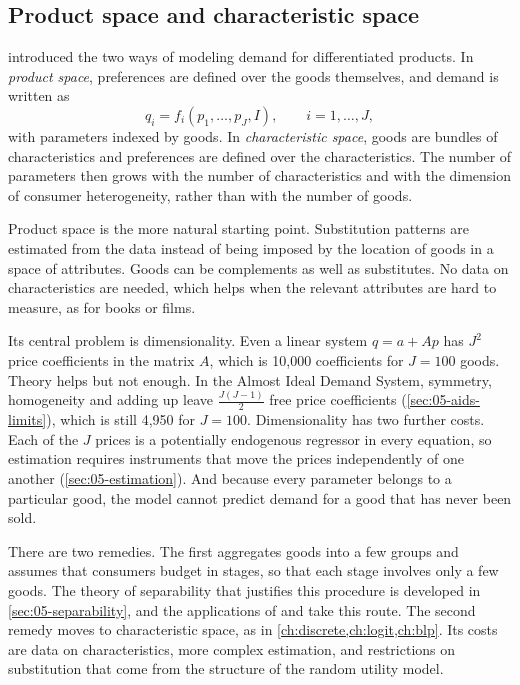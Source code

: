 \subsection{Product space and characteristic space}\label{sec:05-ps-vs-cs}

 introduced the two ways of modeling demand for differentiated products. In \emph{product
space}, preferences are defined over the goods themselves, and demand is written as
\begin{equation}\label{eq:05-productspace}
q_i = f_i(p_1, \dots, p_J, I), \qquad i = 1, \dots, J,
\end{equation}
with parameters indexed by goods. In \emph{characteristic space}, goods are bundles of characteristics and
preferences are defined over the characteristics. The number of parameters then grows with the number of
characteristics and with the dimension of consumer heterogeneity, rather than with the number of goods.

Product space is the more natural starting point. Substitution patterns are estimated from the data instead of
being imposed by the location of goods in a space of attributes. Goods can be complements as well as substitutes. No data on
characteristics are needed, which helps when the relevant attributes are hard to measure, as for books or
films.

Its central problem is dimensionality. Even a linear system $q = a + Ap$ has $J^2$ price coefficients in the
matrix $A$, which is 10{,}000 coefficients for $J = 100$ goods. Theory helps but not enough. In the Almost
Ideal Demand System, symmetry, homogeneity and adding up leave $\frac{J(J-1)}{2}$ free price coefficients
(\cref{sec:05-aids-limits}), which is still 4{,}950 for $J = 100$. Dimensionality has two further costs. Each
of the $J$ prices is a potentially endogenous regressor in every equation, so estimation requires
instruments that move the prices independently of one another (\cref{sec:05-estimation}). And because every
parameter belongs to a particular good, the model cannot predict demand for a good that has never been sold.

There are two remedies. The first aggregates goods into a few groups and assumes that consumers budget in
stages, so that each stage involves only a few goods. The theory of separability that justifies this
procedure is developed in \cref{sec:05-separability}, and the applications of \citet{HausmanLeonardZona1994}
and \citet{ChaudhuriGoldbergJia2006} take this route. The second remedy moves to characteristic space, as
in \cref{ch:discrete,ch:logit,ch:blp}. Its costs are data on characteristics, more complex estimation, and
restrictions on substitution that come from the structure of the random utility model.

